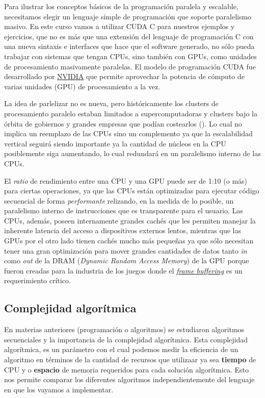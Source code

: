 Para ilustrar los conceptos básicos de la programación paralela y escalable, necesitamos elegir un lenguaje simple de
programación que soporte paralelismo masivo. En este curso vamos a utilizar CUDA C para nuestros ejemplos y ejercicios,
que no es más que una extensión del lenguaje de programación C con una nueva sintaxis e interfaces que hace que el
software generado, no sólo pueda trabajar con sistemas que tengan CPUs, sino también con GPUs, como unidades de
procesamiento masivamente paralelas. El modelo de programación CUDA fue desarrollado por
\href{https://www.nvidia.com/es-la/}{NVIDIA} que permite aprovechar la potencia de cómputo de varias unidades (GPU) de
procesamiento a la vez.

La idea de parlelizar no es nueva, pero históricamente los clusters de procesamiento paralelo estaban limitados a
supercomputadoras y clusters bajo la órbita de gobiernos y grandes empresas que podían costearlos
(\textcite{sutter2005}). Lo cual no implica un reemplazo de las CPUs sino un complemento ya que la escalabilidad
vertical seguirá siendo importante ya la cantidad de núcleos en la CPU posiblemente siga aumentando, lo cual redundará
en un paralelismo interno de las CPUs.

El \textit{ratio} de rendimiento entre una CPU y una GPU puede ser de 1:10 (o más) para ciertas operaciones, ya que las
CPUs están optimizadas para ejecutar código secuencial de forma \textit{performante} relizando, en la medida de lo
posible, un paralelismo interno de instrucciones que es transparente para el usuario. Las CPUs, además, poseen
internamente grandes cachés que les permiten manejar la inherente latencia del acceso a dispositivos externos lentos,
mientras que las GPUs por el otro lado tienen cachés mucho más pequeñas ya que sólo necesitan tener una gran
optimización para mover grandes cantidades de datos tanto \textit{in} como \textit{out} de la DRAM (\textit{Dynamic
Random Access Memory}) de la GPU porque fueron creadas para la industria de los juegos donde el
\href{https://www.youtube.com/shorts/8wj3zVA03WQ}{\textit{frame buffering}} es un requerimiento crítico.

\subsection*{Complejidad algorítmica}

En materias anteriores (programación o algoritmos) se estudiaron algoritmos secuenciales y la importancia de la
complejidad algorítmica. Esta complejidad algorítmica, es un parámetro con el cual podemos medir la eficiencia de un
algoritmo en términos de la cantidad de recursos que utilizaar ya sea \textbf{tiempo} de CPU y o \textbf{espacio} de
memoria requeridos para cada solución algorítmica. Esto nos permite comparar los diferentes algoritmos
independientemente del lenguaje en que los vayamos a implementar.

